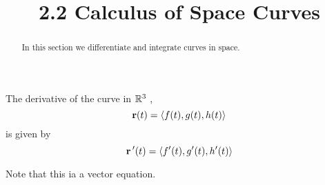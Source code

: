 \documentclass[handout]{ximera}
\title{2.2 Calculus of Space Curves}
\begin{document}
\begin{abstract}
In this section we differentiate and integrate curves in space.
\end{abstract}

\maketitle





The derivative of the curve in $\mathbb R^3$ ,
\[
\mathbf r(t) = \left\langle f(t), g(t), h(t)\right\rangle
\]
is given by
\[
\mathbf r\, '(t) = \left\langle f'(t), g'(t), h'(t)\right\rangle
\]

Note that this ia a vector equation.
 
\end{document}
